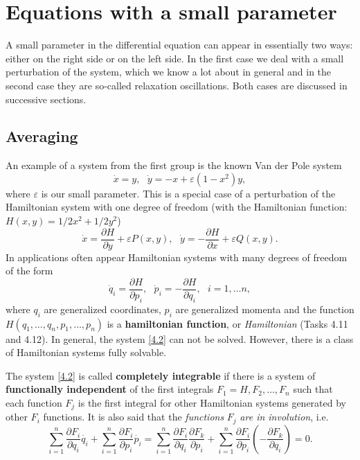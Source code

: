 \chapter{Equations with a small parameter}
A small parameter in the differential equation can appear in essentially two ways:  either on the right side or on the left side. In the first case we deal with a small perturbation of the system, which we know a lot about in general and in the second case they are so-called relaxation oscillations. Both cases are discussed in successive sections.

\section{Averaging}
An example of a system from the first group is the known Van der Pole system
$$
\dot{x}=y,\text{ \ }\dot{y}=-x+\varepsilon (1-x^{2})y,
$$
where $\varepsilon$ is our small parameter. This is a special case of a perturbation of the Hamiltonian system with one degree of freedom (with the Hamiltonian function: $H(x,y)=1/2 x^2 + 1/2 y^2$)
\begin{equation}
\label{4.1}
\dot{x} = \frac{\partial H}{\partial y} +\varepsilon P(x,y),\text{ \ \ }\dot{y}%
=-\frac{\partial H}{\partial x} +\varepsilon Q(x,y).
\end{equation}
In applications often appear Hamiltonian systems with many degrees of freedom of the form 
\begin{equation}
\label{4.2}
\dot{q}_{i}= \frac{\partial H}{\partial p_i},\text{ \ \ }\dot{p}_{i}=- \frac{\partial H}{\partial q_i},%
\text{ \ \ \ }i=1,\ldots n,
\end{equation}
where $q_i$ are generalized coordinates, $p_i$ are generalized momenta and the function \linebreak
$H(q_{1}, \ldots, q_{n}, p_{1}, \ldots, p_{n})$ is a \textbf{hamiltonian function}, or \textit{Hamiltonian} (Tasks 4.11 and 4.12). In general, the system \eqref{4.2} can not be solved. However, there is a class of Hamiltonian systems fully solvable.

\begin{definition}\label{def:4.1}
	The system \eqref{4.2} is called \textbf{completely integrable} if there is a system of \textbf{functionally independent} of the first integrals $F_1 = H, F_2,\ldots , F_n$ such that each function $F_j$ is the first integral for other Hamiltonian systems generated by other $F_i$ functions. It is also said that the \textit{functions} $F_j$ \textit{are in involution}, i.e.
	$$ \sum_{i=1}^{n} \frac{\partial F_i}{\partial q_i} \dot{q_i} + \sum_{i=1}^{n} \frac{\partial F_i}{\partial p_i} \dot{p_i} = \sum_{i=1}^{n} \frac{\partial F_i}{\partial q_i} \frac{\partial F_k}{\partial p_i} + \sum_{i=1}^{n} \frac{\partial F_i}{\partial p_i} \left( -\frac{\partial F_k}{\partial q_i}\right) = 0.$$
\end{definition}

